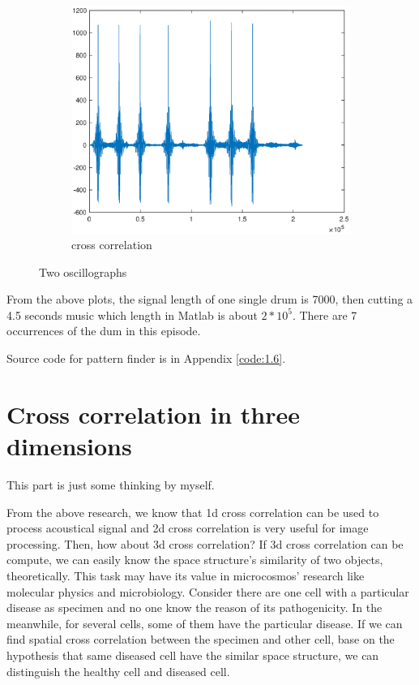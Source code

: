 \begin{figure}[h!]
\begin{subfigure}[t]{0.32\linewidth}
		\centering
		\includegraphics[width=1\linewidth]{figures/part1/crr_vis3.eps}
		\caption{cross correlation}
		\label{fig:crr_vis3}
	\end{subfigure}
	\caption{Two oscillographs}
	\label{fig:wave}
\end{figure} 

From the above plots, the signal length of one single drum is 7000, then cutting a 4.5 seconds music which length in Matlab is about $2*10^5$. There are 7 occurrences of the dum in this episode.

Source code for pattern finder is in Appendix \ref{code:1.6}.

\section{Cross correlation in three dimensions}

This part is just some thinking by myself. 

From the above research, we know that 1d cross correlation can be used to process acoustical signal and 2d cross correlation is very useful for image processing. Then, how about 3d cross correlation? If 3d cross correlation can be compute, we can easily know the space structure's similarity of two objects, theoretically. This task may have its value in microcosmos' research like molecular physics and microbiology. Consider there are one cell with a particular disease as specimen and no one know the reason of its pathogenicity. In the meanwhile, for several cells, some of them have the particular disease. If we can find spatial cross correlation between the specimen and other cell, base on the hypothesis that same diseased cell have the similar space structure, we can distinguish the healthy cell and diseased cell. 

